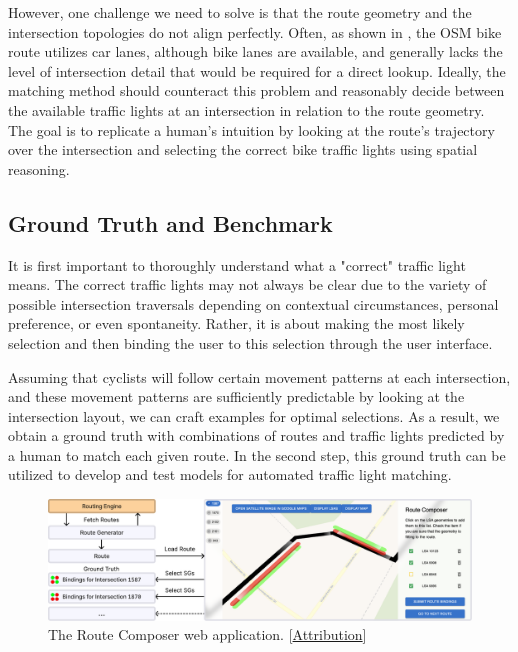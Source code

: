 However, one challenge we need to solve is that the route geometry and the intersection topologies do not align perfectly. Often, as shown in , the OSM bike route utilizes car lanes, although bike lanes are available, and generally lacks the level of intersection detail that would be required for a direct lookup. Ideally, the matching method should counteract this problem and reasonably decide between the available traffic lights at an intersection in relation to the route geometry. The goal is to replicate a human's intuition by looking at the route's trajectory over the intersection and selecting the correct bike traffic lights using spatial reasoning.

\subsection{Ground Truth and Benchmark}

It is first important to thoroughly understand what a "correct" traffic light means. The correct traffic lights may not always be clear due to the variety of possible intersection traversals depending on contextual circumstances, personal preference, or even spontaneity. Rather, it is about making the most likely selection and then binding the user to this selection through the user interface.

Assuming that cyclists will follow certain movement patterns at each intersection, and these movement patterns are sufficiently predictable by looking at the intersection layout, we can craft examples for optimal selections. As a result, we obtain a ground truth with combinations of routes and traffic lights predicted by a human to match each given route. In the second step, this ground truth can be utilized to develop and test models for automated traffic light matching.

\begin{figure}[htbp]
\centering
\includegraphics[width=\linewidth]{images/sg-selection-ground-truth.pdf}
\caption{The Route Composer web application. [\hyperref[attribution]{Attribution}]}
\label{fig:sg-selection-ground-truth}
\end{figure}

